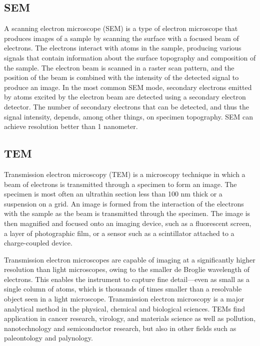 \documentclass[book.tex]{subfiles}
\begin{document}
\subsection{SEM}
A scanning electron microscope (SEM) is a type of electron microscope that produces images of a sample by scanning the surface with a focused beam of electrons. The electrons interact with atoms in the sample, producing various signals that contain information about the surface topography and composition of the sample. The electron beam is scanned in a raster scan pattern, and the position of the beam is combined with the intensity of the detected signal to produce an image. In the most common SEM mode, secondary electrons emitted by atoms excited by the electron beam are detected using a secondary electron detector. The number of secondary electrons that can be detected, and thus the signal intensity, depends, among other things, on specimen topography. SEM can achieve resolution better than 1 nanometer.
\subsection{TEM}
Transmission electron microscopy (TEM) is a microscopy technique in which a beam of electrons is transmitted through a specimen to form an image. The specimen is most often an ultrathin section less than 100 nm thick or a suspension on a grid. An image is formed from the interaction of the electrons with the sample as the beam is transmitted through the specimen. The image is then magnified and focused onto an imaging device, such as a fluorescent screen, a layer of photographic film, or a sensor such as a scintillator attached to a charge-coupled device.

Transmission electron microscopes are capable of imaging at a significantly higher resolution than light microscopes, owing to the smaller de Broglie wavelength of electrons. This enables the instrument to capture fine detail—even as small as a single column of atoms, which is thousands of times smaller than a resolvable object seen in a light microscope. Transmission electron microscopy is a major analytical method in the physical, chemical and biological sciences. TEMs find application in cancer research, virology, and materials science as well as pollution, nanotechnology and semiconductor research, but also in other fields such as paleontology and palynology.
\end{document}
